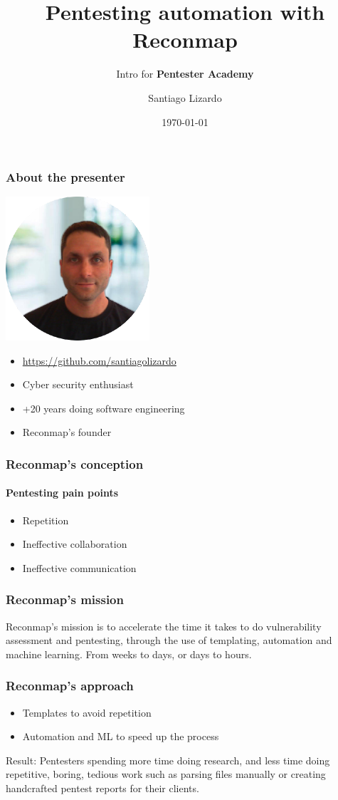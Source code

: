 \documentclass{beamer}
\title{Pentesting automation with \textbf{Reconmap}}
\subtitle{Intro for \textbf{Pentester Academy}}
\author{Santiago Lizardo}
\date{\today}
\begin{document}
\begin{frame}
\titlepage    
\end{frame}

\begin{frame}
	\frametitle{About the presenter}

	\includegraphics[width=0.4\textwidth]{images/santiago-lizardo.png}

	\begin{itemize}
		\item \href{https://github.com/santiagolizardo}{https://github.com/santiagolizardo}
		\item Cyber security enthusiast
		\item +20 years doing software engineering
		\item Reconmap's founder
	\end{itemize}
\end{frame}

\begin{frame}
	\frametitle{Reconmap's conception}
	
	\framesubtitle{Pentesting pain points}
	\begin{itemize}
		\item Repetition	
		\item Ineffective collaboration
		\item Ineffective communication
	\end{itemize}
\end{frame}

\begin{frame}
	\frametitle{Reconmap's mission}
	
	Reconmap's mission is to accelerate the time it takes to do vulnerability assessment and pentesting, through the use of templating, automation and machine learning. From weeks to days, or days to hours.
\end{frame}

\begin{frame}
	\frametitle{Reconmap's approach}
	
	\begin{itemize}
		\item Templates to avoid repetition
		\item Automation and ML to speed up the process
	\end{itemize}
	
	\begin{block}{Result:}
		Pentesters spending more time doing research, and less time doing repetitive, boring, tedious work such as parsing files manually or creating handcrafted pentest reports for their clients.	
	\end{block}
\end{frame}
\end{document}
